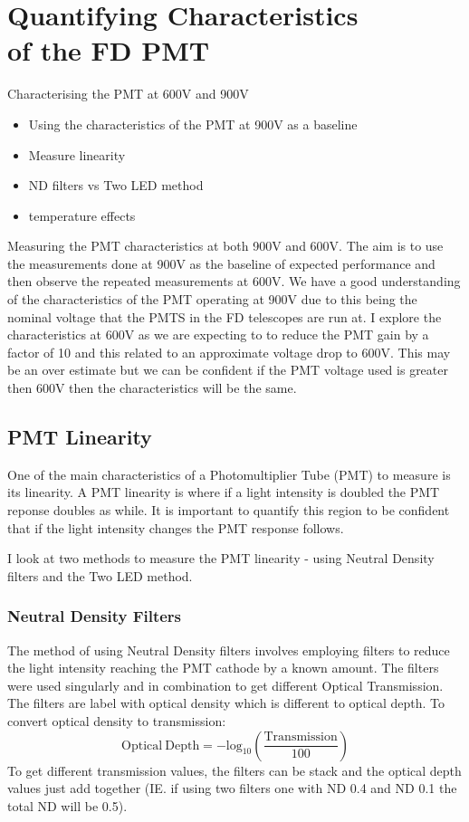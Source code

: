 \chapter[Quantifying Characteristics of the FD PMT]{\centering Quantifying Characteristics \\ of the FD PMT \\}\label{Ch:PMTCharacter}

Characterising the PMT at 600V and 900V
\begin{itemize}
\item Using the characteristics of the PMT at 900V as a baseline
\item Measure linearity
\item ND filters vs Two LED method
\item temperature effects
\end{itemize}

Measuring the PMT characteristics at both 900V and 600V. The aim is to use the measurements done at 900V as the baseline of expected performance and then observe the repeated measurements at 600V. We have a good  understanding of the characteristics of the PMT operating at 900V due to this being the nominal voltage that the PMTS in the FD telescopes are run at. I explore the characteristics at 600V as we are expecting to to reduce the PMT gain by a factor of 10 and this related to an approximate voltage drop to 600V. This may be an over estimate but we can be confident if the PMT voltage used is greater then 600V then the characteristics will be the same.

\section{PMT Linearity}

One of the main characteristics of a Photomultiplier Tube (PMT) to measure is its linearity. A PMT linearity is where if a light intensity is doubled the PMT reponse doubles as while. It is important to quantify this region to be confident that if the light intensity changes the PMT response follows.

I look at two methods to measure the PMT linearity - using Neutral Density filters and the Two LED method.

\subsection{Neutral Density Filters}

The method of using Neutral Density filters involves employing filters to reduce the light intensity reaching the PMT cathode by a known amount. The filters were used singularly and in combination to get different Optical Transmission. The filters are label with optical density which is different to optical depth. To convert optical density to transmission:
\begin{equation}
\mathrm{Optical \ Depth} = - \mathrm{log}_{10}\left(\frac{\mathrm{Transmission}}{100} \right)
\end{equation}
To get different transmission values, the filters can be stack and the optical depth values just add together (IE. if using two filters one with ND 0.4 and ND 0.1 the total ND will be 0.5).


